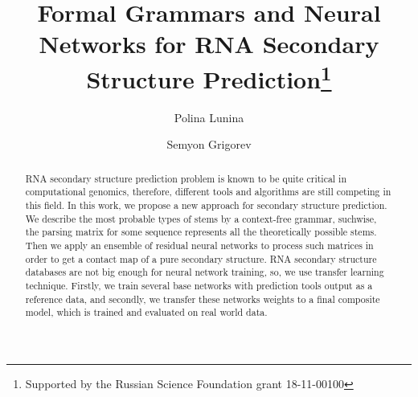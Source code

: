 \documentclass[runningheads]{llncs}
\begin{document}
%
\title{Formal Grammars and Neural Networks for RNA Secondary Structure Prediction\thanks{Supported by the Russian Science Foundation grant 18-11-00100}}
%
%
\author{Polina Lunina \Letter \and
Semyon Grigorev}
%
%
%
\maketitle             %
%
\begin{abstract}
RNA secondary structure prediction problem is known to be quite critical in computational genomics, therefore, different tools and algorithms are still competing in this field. In this work, we propose a new approach for secondary structure prediction. We describe the most probable types of stems by a context-free grammar, suchwise, the parsing matrix for some sequence represents all the theoretically possible stems. Then we apply an ensemble of residual neural networks to process such matrices in order to get a contact map of a pure secondary structure. RNA secondary structure databases are not big enough for neural network training, so, we use transfer learning technique. Firstly, we train several base networks with prediction tools output as a reference data, and secondly, we transfer these networks weights to a final composite model, which is trained and evaluated on real world data.

\end{abstract}
%
%
%
\end{document}

